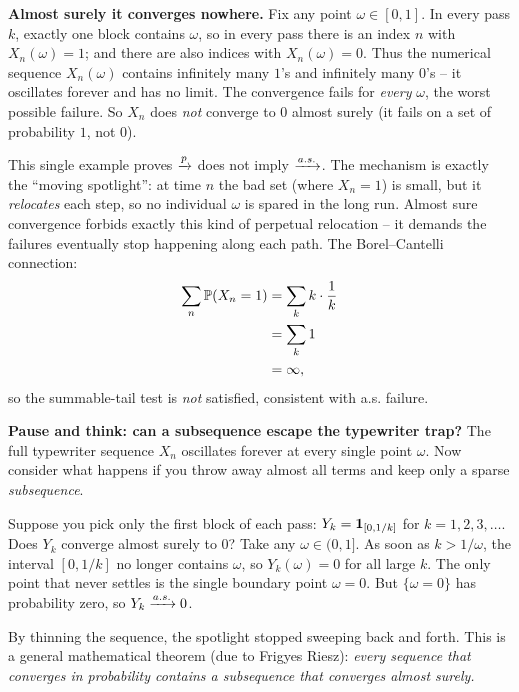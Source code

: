 \textbf{Almost surely it converges nowhere.} Fix any point $\omega\in[0,1]$. In every
pass $k$, exactly one block contains $\omega$, so in every pass there is an index $n$
with $X_n(\omega) = 1$; and there are also indices with $X_n(\omega) = 0$. Thus the
numerical sequence $X_n(\omega)$ contains infinitely many $1$'s and infinitely many
$0$'s -- it oscillates forever and has no limit. The convergence fails for \emph{every}
$\omega$, the worst possible failure. So $X_n$ does \emph{not} converge to $0$ almost
surely (it fails on a set of probability $1$, not $0$).

\begin{happeningbox}
This single example proves $\pto$ does not imply $\asto$. The mechanism is exactly the
``moving spotlight'': at time $n$ the bad set (where $X_n=1$) is small, but it
\emph{relocates} each step, so no individual $\omega$ is spared in the long run. Almost
sure convergence forbids exactly this kind of perpetual relocation -- it demands the
failures eventually stop happening along each path. The Borel--Cantelli connection:
\begin{align*}
  \sum_n \P(X_n=1) &= \sum_k k\cdot\frac1k \\
  &= \sum_k 1 \\
  &= \infty,
\end{align*}
so the summable-tail test is \emph{not} satisfied, consistent with a.s. failure.
\end{happeningbox}

\begin{walkbox}
\textbf{Pause and think: can a subsequence escape the typewriter trap?}
The full typewriter sequence $X_n$ oscillates forever at every single point $\omega$.
Now consider what happens if you throw away almost all terms and keep only a sparse
\emph{subsequence}.

Suppose you pick only the first block of each pass: $Y_k = \ind_{[0, 1/k]}$ for
$k = 1, 2, 3, \dots$. Does $Y_k$ converge almost surely to $0$?
Take any $\omega \in (0,1]$. As soon as $k > 1/\omega$, the interval $[0, 1/k]$ no
longer contains $\omega$, so $Y_k(\omega) = 0$ for all large $k$. The only point that
never settles is the single boundary point $\omega = 0$. But $\{\omega = 0\}$ has
probability zero, so $Y_k \asto 0$.

By thinning the sequence, the spotlight stopped sweeping back and forth. This is a
general mathematical theorem (due to Frigyes Riesz): \emph{every sequence that
converges in probability contains a subsequence that converges almost surely.}
\end{walkbox}

